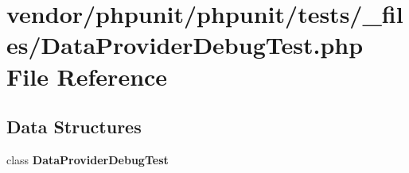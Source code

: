 \section{vendor/phpunit/phpunit/tests/\+\_\+files/\+Data\+Provider\+Debug\+Test.php File Reference}
\label{_data_provider_debug_test_8php}
\subsection*{Data Structures}
\begin{DoxyCompactItemize}
\item 
class {\bf Data\+Provider\+Debug\+Test}
\end{DoxyCompactItemize}
